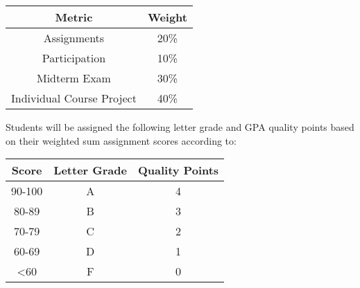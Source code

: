 \begin{table*}[ht!]
    \begin{tabular}{c | c}
        \toprule
        Metric                      & Weight \\

        \midrule
        Assignments                 & 20\% \\
        Participation               & 10\% \\
        Midterm Exam                & 30\% \\
        Individual Course Project   & 40\% \\

        \bottomrule
    \end{tabular}
\end{table*}

Students will be assigned the following letter grade and GPA quality points based on their weighted sum assignment scores according to:

\begin{table*}[h!]
    \begin{tabular}{c | c | c}
        \toprule
        Score & Letter Grade & Quality Points \\
        
        \midrule
        90-100              & A     & 4 \\
        80-89               & B     & 3 \\
        70-79               & C     & 2 \\
        60-69\footnotemark  & D     & 1 \\
        <60                 & F     & 0 \\

        \bottomrule
    \end{tabular}
\end{table*}

